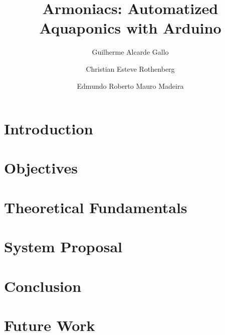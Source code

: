 \documentclass[10pt,a4paper]{article}
\title{Armoniacs: Automatized Aquaponics with Arduino}
\author{Guilherme Alcarde Gallo \and Christian Esteve Rothenberg \and Edmundo Roberto Mauro Madeira}
\begin{document}
\maketitle

\newpage

\section{Introduction}
\label{sec:introduction}


\section{Objectives}
\label{objectives}


\section{Theoretical Fundamentals}
\label{fundamentals}


\section{System Proposal}
\label{proposal}


\section{Conclusion}
\label{conclusion}


\section{Future Work}
\label{future}



% 


% 



\nocite{useCaseStyle}
\end{document}
